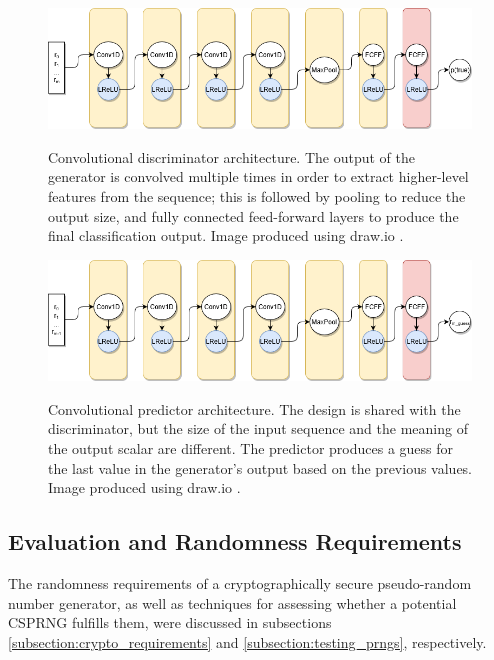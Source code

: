 \documentclass[12pt, titlepage]{report}
\theoremstyle{definition}
\begin{document}
\begin{figure}
\centering
\includegraphics[width=1\textwidth]{img/discriminator.png}\\
\caption{Convolutional discriminator architecture. The output of the generator is convolved multiple times in order to extract higher-level features from the sequence; this is followed by pooling to reduce the output size, and fully connected feed-forward layers to produce the final classification output. Image produced using draw.io \cite{jgraph2018draw}.}
\label{figure:architecture_conv}
\end{figure}

\begin{figure}
\centering
\includegraphics[width=1\textwidth]{img/predictor.png}\\
\caption{Convolutional predictor architecture. The design is shared with the discriminator, but the size of the input sequence and the meaning of the output scalar are different. The predictor produces a guess for the last value in the generator's output based on the previous values. Image produced using draw.io \cite{jgraph2018draw}.}
\label{figure:architecture_conv}
\end{figure}




\subsection{Evaluation and Randomness Requirements}\label{subsection:eval_and_randomness}
The randomness requirements of a cryptographically secure pseudo-random number generator, as well as techniques for assessing whether a potential CSPRNG fulfills them, were discussed in subsections \ref{subsection:crypto_requirements} and \ref{subsection:testing_prngs}, respectively.
\end{document}
